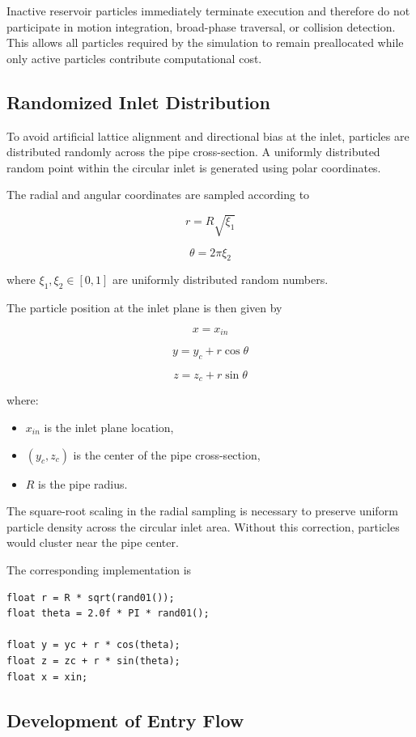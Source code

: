 \documentclass[11pt]{article}
\begin{document}
Inactive reservoir particles immediately terminate execution and therefore do not participate in motion integration, broad-phase traversal, or collision detection. This allows all particles required by the simulation to remain preallocated while only active particles contribute computational cost.

\subsection{Randomized Inlet Distribution}

To avoid artificial lattice alignment and directional bias at the inlet, particles are distributed randomly across the pipe cross-section. A uniformly distributed random point within the circular inlet is generated using polar coordinates.

The radial and angular coordinates are sampled according to

\[
r = R\sqrt{\xi_1}
\]

\[
\theta = 2\pi \xi_2
\]

where $\xi_1,\xi_2 \in [0,1]$ are uniformly distributed random numbers.

The particle position at the inlet plane is then given by

\[
x = x_{in}
\]

\[
y = y_c + r\cos\theta
\]

\[
z = z_c + r\sin\theta
\]

where:

\begin{itemize}
    \item $x_{in}$ is the inlet plane location,
    \item $(y_c,z_c)$ is the center of the pipe cross-section,
    \item $R$ is the pipe radius.
\end{itemize}

The square-root scaling in the radial sampling is necessary to preserve uniform particle density across the circular inlet area. Without this correction, particles would cluster near the pipe center.

The corresponding implementation is

\begin{verbatim}
float r = R * sqrt(rand01());
float theta = 2.0f * PI * rand01();

float y = yc + r * cos(theta);
float z = zc + r * sin(theta);
float x = xin;
\end{verbatim}
\subsection{Development of Entry Flow}
\end{document}
